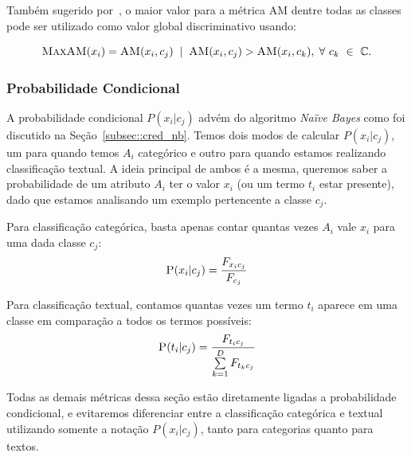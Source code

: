 Também sugerido por~\cite{Mengle08}, o maior valor para a métrica \textsc{AM} dentre todas as classes pode ser utilizado como valor global discriminativo usando:
 
 \begin{equation}\label{eqn::maxdom}
 \textsc{MaxAM}(x_i) = \textsc{AM}(x_i,c_j) \; \; | \;\; \textsc{AM}(x_i, c_j) > \textsc{AM}(x_i, c_k), \; \forall\ c_k\ \in\ \mathbb{C}.
\end{equation}


\subsubsection{Probabilidade Condicional} %
\label{subsubsection::pc}

A probabilidade condicional $P(x_i|c_j)$ advém do algoritmo \textit{Naïve Bayes} como foi discutido na Seção~\ref{subsec::cred_nb}.
Temos dois modos de calcular $P(x_i|c_j)$, um para quando temos $A_i$ categórico e outro para quando estamos realizando classificação textual.
A ideia principal de ambos é a mesma, queremos saber a probabilidade de um atributo $A_i$ ter o valor $x_i$ (ou um termo $t_i$ estar presente), dado que estamos analisando um exemplo pertencente a classe $c_j$.

Para classificação categórica, basta apenas contar quantas vezes $A_i$ vale $x_i$ para uma dada classe $c_j$:
    \begin{equation}\label{eqn::nbcattexto}
        \textsc{P}(x_i|c_j) = \frac{ F_{x_{i}c_{j}} }{ F_{c_{j}} } 
    \end{equation}
        
Para classificação textual, contamos quantas vezes um termo $t_i$ aparece em uma classe em comparação a todos os termos possíveis:
    \begin{equation}\label{eqn::nbcattexto}
       \textsc{P}(t_i|c_j) = \frac{ F_{t_{i}c_{j}} }{ \sum\limits^{D}_{k = 1} {  F_{t_{k}c_{j}}} } 
    \end{equation}

Todas as demais métricas dessa seção estão diretamente ligadas a probabilidade condicional, e evitaremos diferenciar entre a classificação categórica e textual utilizando somente a notação $P(x_i|c_j)$, tanto para categorias quanto para textos.


